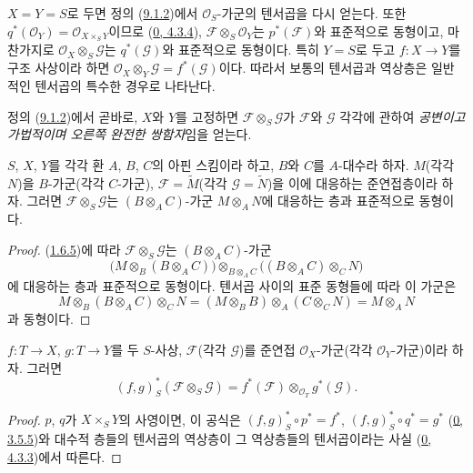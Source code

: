 $X=Y=S$로 두면 정의 (\hyperref[I.9.1.2-ko]{9.1.2})에서
$\mathscr{O}_S$-가군의 텐서곱을 다시 얻는다. 또한
$q^*(\mathscr{O}_Y)=\mathscr{O}_{X\times_S Y}$이므로
(\hyperref[0.4.3.4-ko]{0, 4.3.4}),
$\mathscr{F}\otimes_S\mathscr{O}_Y$는 $p^*(\mathscr{F})$와 표준적으로
동형이고, 마찬가지로 $\mathscr{O}_X\otimes_S\mathscr{G}$는
$q^*(\mathscr{G})$와 표준적으로 동형이다. 특히 $Y=S$로 두고
$f:X\to Y$를 구조 사상이라 하면
$\mathscr{O}_X\otimes_Y\mathscr{G}=f^*(\mathscr{G})$이다. 따라서 보통의
텐서곱과 역상층은 일반적인 텐서곱의 특수한 경우로 나타난다.

정의 (\hyperref[I.9.1.2-ko]{9.1.2})에서 곧바로, $X$와 $Y$를 고정하면
$\mathscr{F}\otimes_S\mathscr{G}$가 $\mathscr{F}$와 $\mathscr{G}$ 각각에
관하여 \emph{공변이고 가법적이며 오른쪽 완전한 쌍함자}임을 얻는다.

\begin{proposition}[9.1.3]
\label{I.9.1.3-ko}
$S$, $X$, $Y$를 각각 환 $A$, $B$, $C$의 아핀 스킴이라 하고, $B$와
$C$를 $A$-대수라 하자. $M$(각각 $N$)을 $B$-가군(각각 $C$-가군),
$\mathscr{F}=\widetilde{M}$(각각 $\mathscr{G}=\widetilde{N}$)을 이에
대응하는 준연접층이라 하자. 그러면 $\mathscr{F}\otimes_S\mathscr{G}$는
$(B\otimes_A C)$-가군 $M\otimes_A N$에 대응하는 층과 표준적으로
동형이다.
\end{proposition}

\begin{proof}
(\hyperref[I.1.6.5-ko]{1.6.5})에 따라
$\mathscr{F}\otimes_S\mathscr{G}$는 $(B\otimes_A C)$-가군
\[
  \bigl(M\otimes_B(B\otimes_A C)\bigr)
  \otimes_{B\otimes_A C}
  \bigl((B\otimes_A C)\otimes_C N\bigr)
\]
에 대응하는 층과 표준적으로 동형이다. 텐서곱 사이의 표준 동형들에
따라 이 가군은
\[
  M\otimes_B(B\otimes_A C)\otimes_C N
  =(M\otimes_B B)\otimes_A(C\otimes_C N)=M\otimes_A N
\]
과 동형이다.
\end{proof}

\begin{proposition}[9.1.4]
\label{I.9.1.4-ko}
$f:T\to X$, $g:T\to Y$를 두 $S$-사상, $\mathscr{F}$(각각
$\mathscr{G}$)를 준연접 $\mathscr{O}_X$-가군(각각
$\mathscr{O}_Y$-가군)이라 하자. 그러면
\[
  (f,g)_S^*(\mathscr{F}\otimes_S\mathscr{G})
  =f^*(\mathscr{F})\otimes_{\mathscr{O}_T}g^*(\mathscr{G}).
\]
\end{proposition}

\begin{proof}
$p$, $q$가 $X\times_S Y$의 사영이면, 이 공식은
$(f,g)_S^*\circ p^*=f^*$, $(f,g)_S^*\circ q^*=g^*$
(\hyperref[0.3.5.5-ko]{0, 3.5.5})와 대수적 층들의 텐서곱의 역상층이
그 역상층들의 텐서곱이라는 사실
(\hyperref[0.4.3.3-ko]{0, 4.3.3})에서 따른다.
\end{proof}

